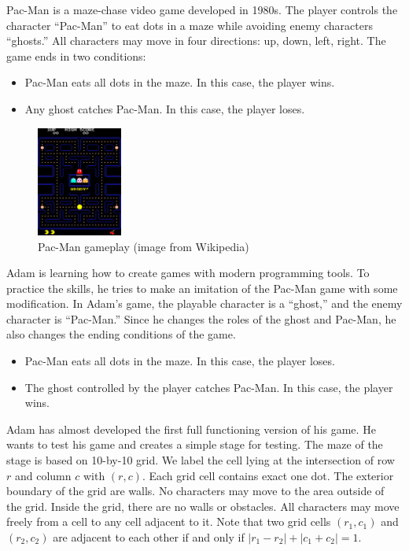 Pac-Man is a maze-chase video game developed in 1980s. 
The player controls the character ``Pac-Man'' to eat dots in a maze while
avoiding enemy characters ``ghosts.'' 
All characters may move in four directions: up, down, left, right.
The game ends in two conditions:
\begin{itemize}
\tightlist
\item Pac-Man eats all dots in the maze. In this case, the player wins.
\item Any ghost catches Pac-Man. In this case, the player loses.
\end{itemize}

\begin{figure}[h]
\center
\includegraphics[width=0.25\textwidth]{image/pacman.png}
\caption{Pac-Man gameplay (image from Wikipedia)}
\end{figure}

Adam is learning how to create games with modern programming tools.
To practice the skills, he tries to make an imitation of the Pac-Man 
game with some modification.
In Adam's game, the playable character is a ``ghost,'' 
and the enemy character is ``Pac-Man.'' 
Since he changes the roles of the ghost and Pac-Man, 
he also changes the ending conditions of the game.
\begin{itemize}
\tightlist
\item Pac-Man eats all dots in the maze. In this case, the player loses.
\item The ghost controlled by the player catches Pac-Man. In this case, the player wins.
\end{itemize}

Adam has almost developed the first full functioning version of his game.
He wants to test his game and creates a simple stage for testing.
The maze of the stage is based on 10-by-10 grid. 
We label the cell lying at the intersection of row $r$ and column $c$ with 
$(r,c)$.
Each grid cell contains exact one dot.
The exterior boundary of the grid are walls. 
No characters may move to the area outside of the grid.
Inside the grid, there are no walls or obstacles.
All characters may move freely from a cell to any cell adjacent to it.
Note that two grid cells $(r_1,c_1)$ and $(r_2,c_2)$ are adjacent to each other 
if and only if $|r_1-r_2|+|c_1+c_2|=1$.
 
